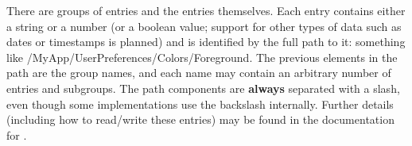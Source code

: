 There are groups of entries and the entries themselves. Each entry contains either a string or a number
(or a boolean value; support for other types of data such as dates or
timestamps is planned) and is identified by the full path to it: something
like /MyApp/UserPreferences/Colors/Foreground. The previous elements in the
path are the group names, and each name may contain an arbitrary number of entries
and subgroups. The path components are {\bf always} separated with a slash,
even though some implementations use the backslash internally. Further
details (including how to read/write these entries) may be found in 
the documentation for .

